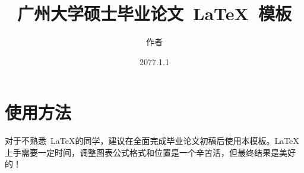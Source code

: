\documentclass{GZHUMaster}
\begin{document}
\setmainfont{Times New Roman}  %

\ConfLvl{}                     %
\title{广州大学硕士毕业论文~\LaTeX~模板}                       %
\author{作者}                   %
\Supervisor{}                  %
\date{2077.1.1}               %
\Chairman{}                    %
\Member{}                      %

\maketitle

\frontmatter
{}               %
\cleardoublepage
\newpage
\pagestyle{fancy}
\fancyfancy


{\tableofcontents}

\mainmatter %
\renewcommand{\baselinestretch}{1.5}  %
\renewcommand{\thefigure}{\thechapter-\arabic{figure}} %
\renewcommand{\thetable}{\thechapter-\arabic{table}}   %

\chapter{使用方法}
对于不熟悉~\LaTeX 的同学，建议在全面完成毕业论文初稿后使用本模板。\LaTeX 上手需要一定时间，调整图表公式格式和位置是一个辛苦活，但最终结果是美好的！
\end{document}
